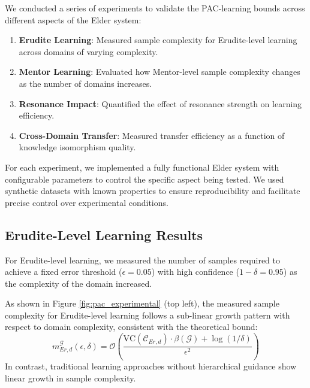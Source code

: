 We conducted a series of experiments to validate the PAC-learning bounds across different aspects of the Elder system:

\begin{enumerate}
    \item \textbf{Erudite Learning}: Measured sample complexity for Erudite-level learning across domains of varying complexity.
    
    \item \textbf{Mentor Learning}: Evaluated how Mentor-level sample complexity changes as the number of domains increases.
    
    \item \textbf{Resonance Impact}: Quantified the effect of resonance strength on learning efficiency.
    
    \item \textbf{Cross-Domain Transfer}: Measured transfer efficiency as a function of knowledge isomorphism quality.
\end{enumerate}

For each experiment, we implemented a fully functional Elder system with configurable parameters to control the specific aspect being tested. We used synthetic datasets with known properties to ensure reproducibility and facilitate precise control over experimental conditions.

\subsection{Erudite-Level Learning Results}

For Erudite-level learning, we measured the number of samples required to achieve a fixed error threshold ($\epsilon = 0.05$) with high confidence ($1-\delta = 0.95$) as the complexity of the domain increased.

\begin{result}
As shown in Figure \ref{fig:pac_experimental} (top left), the measured sample complexity for Erudite-level learning follows a sub-linear growth pattern with respect to domain complexity, consistent with the theoretical bound:
\begin{equation}
m_{Er,d}^{\mathcal{G}}(\epsilon, \delta) = \mathcal{O}\left(\frac{\text{VC}(\mathcal{C}_{Er,d}) \cdot \beta(\mathcal{G}) + \log(1/\delta)}{\epsilon^2}\right)
\end{equation}
In contrast, traditional learning approaches without hierarchical guidance show linear growth in sample complexity.
\end{result}

